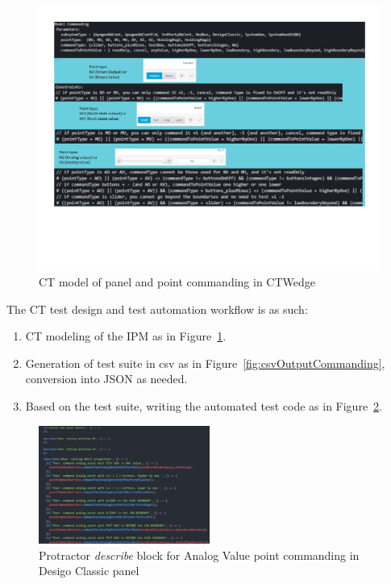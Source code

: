 \documentclass[conference]{IEEEtran}
\begin{document}
	\begin{figure}[!ht]
		\centering
			\includegraphics[width=1.00\textwidth,]{modelCommanding.pdf}
			\caption{CT model of panel and point commanding in CTWedge}
			\label{fig:modelCommanding}
	\end{figure}

	The CT test design and test automation workflow is as such:
	\begin{enumerate}
		\item CT modeling of the IPM as in Figure~\ref{fig:modelCommanding}.
		\item Generation of test suite in csv as in Figure~\ref{fig:csvOutputCommanding}, conversion into JSON as needed.
		\item Based on the test suite, writing the automated test code as in Figure~\ref{fig:pointCommandingTestCode}.
	\end{enumerate}

	\begin{figure}[!b]
		\includegraphics[width=0.50\textwidth,]{pointCommandingTestCode.pdf}
		\caption{Protractor \textit{describe} block for Analog Value point commanding in Desigo Classic panel}
		\label{fig:pointCommandingTestCode}
	\end{figure}
\end{document}
